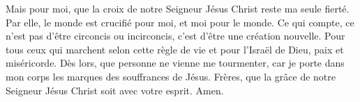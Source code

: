 Mais pour moi, que la croix de notre Seigneur Jésus Christ reste ma seule fierté.
	Par elle, le monde est crucifié pour moi, et moi pour le monde.
Ce qui compte, ce n’est pas d’être circoncis ou incirconcis,
	c’est d’être une création nouvelle.
Pour tous ceux qui marchent selon cette règle de vie et pour l’Israël de Dieu,
		paix et miséricorde.
Dès lors, que personne ne vienne me tourmenter,
	car je porte dans mon corps les marques des souffrances de Jésus.
Frères, que la grâce de notre Seigneur Jésus Christ soit avec votre esprit. Amen.
